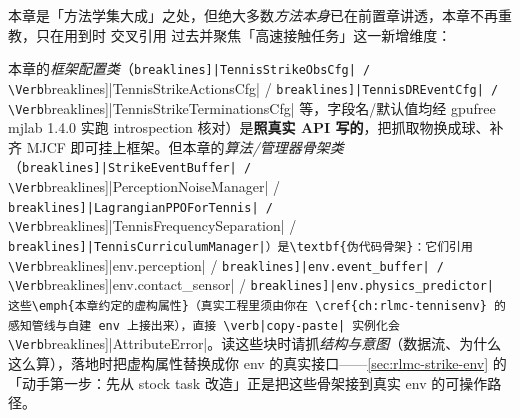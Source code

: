 \begin{note}
本章是「方法学集大成」之处，但绝大多数\emph{方法本身}已在前置章讲透，本章不再重教，只在用到时 交叉引用 过去并聚焦「高速接触任务」这一新增维度：
\end{note}

\begin{note}\label{note:rlmc-strike-pseudocode}
本章的\emph{框架配置类}（\Verb[breaklines]|TennisStrikeObsCfg| / \Verb[breaklines]|TennisStrikeActionsCfg| / \Verb[breaklines]|TennisDREventCfg| / \Verb[breaklines]|TennisStrikeTerminationsCfg| 等，字段名/默认值均经 gpufree mjlab 1.4.0 实跑 introspection 核对）是\textbf{照真实 API 写的}，把抓取物换成球、补齐 MJCF 即可挂上框架。但本章的\emph{算法/管理器骨架类}（\Verb[breaklines]|StrikeEventBuffer| / \Verb[breaklines]|PerceptionNoiseManager| / \Verb[breaklines]|LagrangianPPOForTennis| / \Verb[breaklines]|TennisFrequencySeparation| / \Verb[breaklines]|TennisCurriculumManager|）是\textbf{伪代码骨架}：它们引用 \Verb[breaklines]|env.perception| / \Verb[breaklines]|env.event_buffer| / \Verb[breaklines]|env.contact_sensor| / \Verb[breaklines]|env.physics_predictor| 这些\emph{本章约定的虚构属性}（真实工程里须由你在 \cref{ch:rlmc-tennisenv} 的感知管线与自建 env 上接出来），直接 \verb|copy-paste| 实例化会 \Verb[breaklines]|AttributeError|。读这些块时请抓\emph{结构与意图}（数据流、为什么这么算），落地时把虚构属性替换成你 env 的真实接口——\cref{sec:rlmc-strike-env} 的「动手第一步：先从 stock task 改造」正是把这些骨架接到真实 env 的可操作路径。
\end{note}


